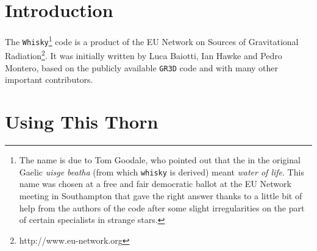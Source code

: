 \documentclass{article}
\begin{document}





\begin{abstract}
  {\tt Whisky} is a fully general-relativistic three-dimensional hydrodynamics code. It evolves the
  hydrodynamics using High Resolution Shock Capturing methods and can
  work with realistic equations of state. The evolution of the
  spacetime can be done by any other ``appropriate'' thorn, such as
  the {\tt CCATIE} code, maintained and developed at the Albert-Einstein-Institut (Potsdam).
\end{abstract}


\section{Introduction}
\label{sec:intro}

The {\tt Whisky}\footnote{The name is
  due to Tom Goodale, who pointed out that the in the original Gaelic
  {\it uisge beatha} (from which {\tt whisky} is derived) meant {\it water of
  life}. This name was chosen at a free and fair democratic ballot
  at the EU Network meeting in Southampton that gave the right answer
  thanks to a little bit of help from the authors of the code after
  some slight irregularities on the part of certain specialists in
  strange stars.} code is a product of the EU Network on Sources of
Gravitational Radiation\footnote{http://www.eu-network.org}. It was initially written by Luca Baiotti, Ian Hawke
and Pedro Montero, based on the publicly available {\tt GR3D} code and with many other important
contributors.



\section{Using This Thorn}
\label{sec:use}
\end{document}
